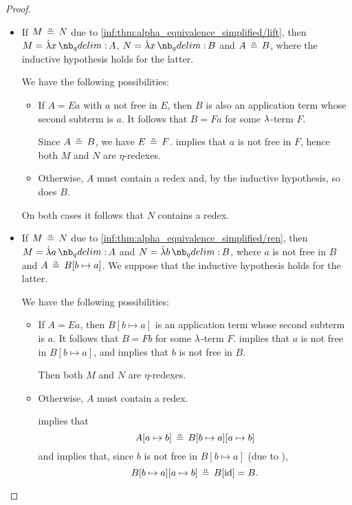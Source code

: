 \begin{proof}
\begin{itemize}
    \item If \( M \aequiv N \) due to \ref{inf:thm:alpha_equivalence_simplified/lift}, then \( M = \qabs x A \), \( N = \qabs x B \) and \( A \aequiv B \), where the inductive hypothesis holds for the latter.

    We have the following possibilities:
    \begin{itemize}
      \item If \( A = Ea \) with \( a \) not free in \( E \), then \( B \) is also an application term whose second subterm is \( a \). It follows that \( B = Fa \) for some \( {\mathrm \lambda} \)-term \( F \).

      Since \( A \aequiv B \), we have \( E \aequiv F \).  implies that \( a \) is not free in \( F \), hence both \( M \) and \( N \) are \( \eta \)-redexes.

      \item Otherwise, \( A \) must contain a redex and, by the inductive hypothesis, so does \( B \).
    \end{itemize}

    On both cases it follows that \( N \) contains a redex.

    \item If \( M \aequiv N \) due to \ref{inf:thm:alpha_equivalence_simplified/ren}, then \( M = \qabs a A \) and \( N = \qabs b B \), where \( a \) is not free in \( B \) and \( A \aequiv B[b \mapsto a] \). We suppose that the inductive hypothesis holds for the latter.

    We have the following possibilities:
    \begin{itemize}
      \item If \( A = Ea \), then \( B[b \mapsto a] \) is an application term whose second subterm is \( a \). It follows that \( B = Fb \) for some \( {\mathrm \lambda} \)-term \( F \).  implies that \( a \) is not free in \( B[b \mapsto a] \), and  implies that \( b \) is not free in \( B \).

      Then both \( M \) and \( N \) are \( \eta \)-redexes.

      \item Otherwise, \( A \) must contain a redex.

       implies that
      \begin{equation*}
        A[a \mapsto b] \aequiv B[b \mapsto a][a \mapsto b]
      \end{equation*}
      and  implies that, since \( b \) is not free in \( B[b \mapsto a] \) (due to ),
      \begin{equation*}
        B[b \mapsto a][a \mapsto b] \aequiv B[\id] = B.
      \end{equation*}


\end{itemize}
\end{itemize}
\end{proof}
